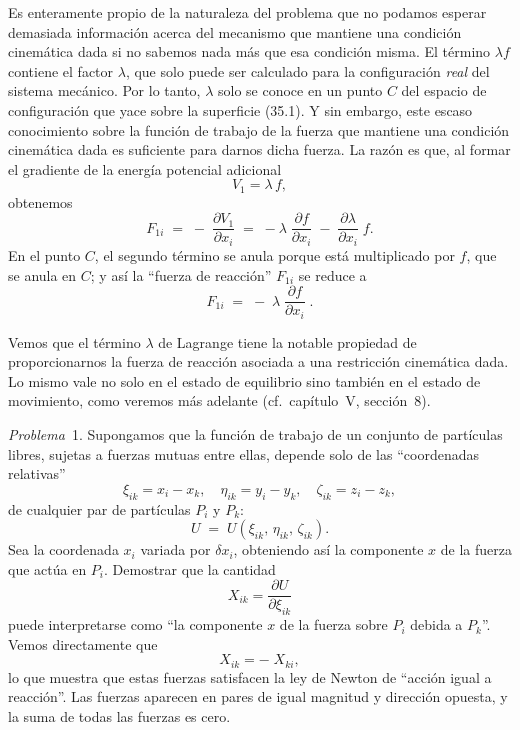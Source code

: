 Es enteramente propio de la naturaleza del problema que no podamos esperar demasiada información acerca del mecanismo que mantiene una condición cinemática dada si no sabemos nada más que esa condición misma. El término $\lambda f$ contiene el factor $\lambda$, que solo puede ser calculado para la configuración \emph{real} del sistema mecánico. Por lo tanto, $\lambda$ solo se conoce en un punto $C$ del espacio de configuración que yace sobre la superficie (35.1). Y sin embargo, este escaso conocimiento sobre la función de trabajo de la fuerza que mantiene una condición cinemática dada es suficiente para darnos dicha fuerza. La razón es que, al formar el gradiente de la energía potencial adicional
\begin{equation}
V_1 = \lambda\,f, \tag{35.5}
\end{equation}
obtenemos
\begin{equation}
F_{1i} \;=\; -\;\frac{\partial V_1}{\partial x_i} \;=\; -\lambda\;\frac{\partial f}{\partial x_i} \;-\; \frac{\partial\lambda}{\partial x_i}\;f. \tag{35.6}
\end{equation}
En el punto $C$, el segundo término se anula porque está multiplicado por $f$, que se anula en $C$; y así la ``fuerza de reacción'' $F_{1i}$ se reduce a
\begin{equation}
F_{1i} \;=\; -\;\lambda\;\frac{\partial f}{\partial x_i}\;. \tag{35.7}
\end{equation}

Vemos que el término $\lambda$ de Lagrange tiene la notable propiedad de proporcionarnos la fuerza de reacción asociada a una restricción cinemática dada. Lo mismo vale no solo en el estado de equilibrio sino también en el estado de movimiento, como veremos más adelante (cf.\ capítulo~V, sección~8).

\medskip
\noindent\textit{Problema}~1. Supongamos que la función de trabajo de un conjunto de partículas libres, sujetas a fuerzas mutuas entre ellas, depende solo de las ``coordenadas relativas''
\begin{equation}
\xi_{ik} = x_i - x_k, \quad \eta_{ik} = y_i - y_k, \quad \zeta_{ik} = z_i - z_k, \tag{35.8}
\end{equation}
de cualquier par de partículas $P_i$ y $P_k$:
\begin{equation}
U \;=\; U(\xi_{ik},\, \eta_{ik},\, \zeta_{ik}). \tag{35.9}
\end{equation}
Sea la coordenada $x_i$ variada por $\delta x_i$, obteniendo así la componente $x$ de la fuerza que actúa en $P_i$. Demostrar que la cantidad
\begin{equation}
X_{ik} = \frac{\partial U}{\partial \xi_{ik}} \tag{35.10}
\end{equation}
puede interpretarse como ``la componente $x$ de la fuerza sobre $P_i$ debida a $P_k$''. Vemos directamente que
\begin{equation}
X_{ik} = -\;X_{ki}, \tag{35.11}
\end{equation}
lo que muestra que estas fuerzas satisfacen la ley de Newton de ``acción igual a reacción''. Las fuerzas aparecen en pares de igual magnitud y dirección opuesta, y la suma de todas las fuerzas es cero.


